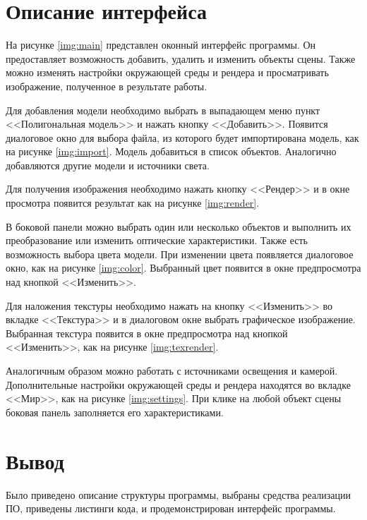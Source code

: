 \section{Описание интерфейса}

На рисунке \ref{img:main} представлен оконный интерфейс программы. Он предоставляет возможность добавить, удалить и изменить объекты сцены. Также можно изменять настройки окружающей среды и рендера и просматривать изображение, полученное в результате работы.


Для добавления модели необходимо выбрать в выпадающем меню пункт <<Полигональная модель>> и нажать кнопку <<Добавить>>. Появится диалоговое окно для выбора файла, из которого будет импортирована модель, как на рисунке \ref{img:import}. Модель добавиться в список объектов. Аналогично добавляются другие модели и источники света.


Для получения изображения необходимо нажать кнопку <<Рендер>> и в окне просмотра появится результат как на рисунке \ref{img:render}.


В боковой панели можно выбрать один или несколько объектов и выполнить их преобразование или изменить оптические характеристики. Также есть возможность выбора цвета модели. При изменении цвета появляется диалоговое окно, как на рисунке \ref{img:color}. Выбранный цвет появится в окне предпросмотра над кнопкой <<Изменить>>.



Для наложения текстуры необходимо нажать на кнопку <<Изменить>> во вкладке <<Текстура>> и в диалоговом окне выбрать графическое изображение. Выбранная текстура появится в окне предпросмотра над кнопкой <<Изменить>>, как на рисунке \ref{img:texrender}.

\clearpage


Аналогичным образом можно работать с источниками освещения и камерой. Дополнительные настройки окружающей среды и рендера находятся во вкладке <<Мир>>, как на рисунке \ref{img:settings}.
При клике на любой объект сцены боковая панель заполняется его характеристиками.


\clearpage

\section*{Вывод}

Было приведено описание структуры программы, выбраны средства реализации ПО, приведены листинги кода, и продемонстрирован интерфейс
программы.
